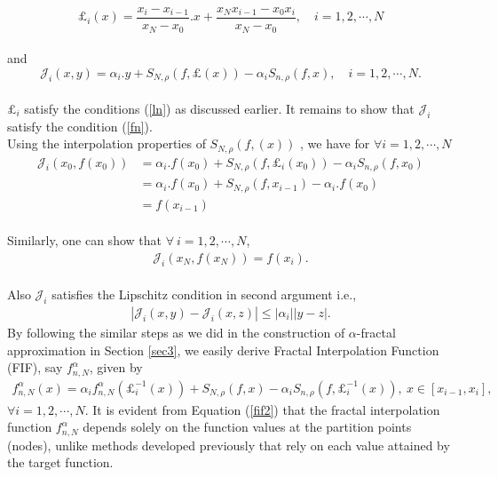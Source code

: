 \documentclass{article}[12pt, a4]
\begin{document}
	\begin{equation}\label{defli2}
		\pounds_i(x)= \frac{x_i -x_{i-1}}{x_N-x_0}.x +\frac{x_N x_{i-1} -x_0 x_i}{x_N-x_0}, \quad i =1,2,\cdots,N
	\end{equation}\\
	and 
	\begin{equation}\label{deffi2}
		\mathcal{J}_i(x,y)=\alpha_{i}.y+S_{N,\rho}(f,\pounds(x))-\alpha_{i}S_{n,\rho}(f, x), \quad i =1,2,\cdots,N.
	\end{equation}\\
	$\pounds_i$ satisfy the conditions (\ref{ln}) as discussed earlier. It remains to show that $\mathcal{J}_i$ satisfy the condition (\ref{fn}).\\
	Using the interpolation properties of $S_{N,\rho}(f,(x))$ \cite{QIAN2022126781}, we have for $ \forall i=1,2,\cdots,N$
	\begin{align*}
		\mathcal{J}_i(x_0,f(x_0))&=\alpha_{i}.f(x_0)+S_{N,\rho}(f,\pounds_{i}(x_0))-\alpha_{i}S_{n,\rho}(f, x_0)\\
		&=\alpha_{i}.f(x_0)+S_{N,\rho}(f,x_{i-1})-\alpha_{i}.f(x_0)\\
		&=f(x_{i-1})
	\end{align*}\\
	Similarly, one can show that $\forall~ i=1,2,\cdots,N$,
	\begin{align*}
		\mathcal{J}_i(x_N,f(x_N))=f(x_i).
	\end{align*}\\
	Also $\mathcal{J}_i$ satisfies the Lipschitz condition in second argument i.e.,
	\begin{align*}
		|\mathcal{J}_i(x,y)-\mathcal{J}_i(x,z)|\leq |\alpha_{i}||y-z|.
	\end{align*}
	By following the similar steps as we did in the construction of $\alpha$-fractal approximation in Section \ref{sec3}, we easily derive Fractal Interpolation Function (FIF), say $f_{n, N}^{\alpha}$, given by
	\begin{align}\label{fif2}
		f_{n, N}^{\alpha}(x)=\alpha_{i}f_{n, N}^{\alpha}(\pounds_{i}^{-1}(x))+S_{N,\rho}(f, x)-\alpha_{i}S_{n,\rho}(f, \pounds_{i}^{-1}(x)),~ x\in [x_{i-1}, x_i],
	\end{align}
	$  \forall i=1,2,\cdots,N.$
	It is evident from Equation (\ref{fif2}) that the fractal interpolation function $f_{n, N}^{\alpha}$ depends solely on the function values at the partition points (nodes), unlike methods developed previously that rely on each value attained by the target function.\\  
\end{document}
